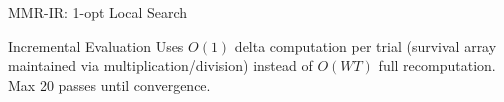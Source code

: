 \documentclass[aspectratio=169,10pt]{beamer}
\begin{document}
\begin{frame}[shrink=5]{MMR-IR: 1-opt Local Search}
\begin{center}
\begin{tikzpicture}[scale=0.65, every node/.style={font=\footnotesize}]
  \end{tikzpicture}
  \end{center}

  \vspace{0.1cm}

  \begin{alertblock}{Incremental Evaluation}
    \small
    Uses $O(1)$ delta computation per trial (survival array maintained via
    multiplication/division) instead of $O(WT)$ full recomputation.
    Max 20 passes until convergence.
  \end{alertblock}

\end{frame}


\end{document}
